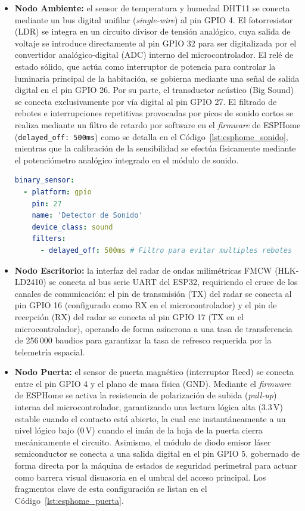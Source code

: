 \begin{itemize}
    \item \textbf{Nodo Ambiente:} el sensor de temperatura y humedad DHT11 se conecta mediante un bus digital unifilar (\textit{single-wire}) al pin GPIO 4. El fotorresistor (LDR) se integra en un circuito divisor de tensión analógico, cuya salida de voltaje se introduce directamente al pin GPIO 32 para ser digitalizada por el convertidor analógico-digital (ADC) interno del microcontrolador. El relé de estado sólido, que actúa como interruptor de potencia para controlar la luminaria principal de la habitación, se gobierna mediante una señal de salida digital en el pin GPIO 26. Por su parte, el transductor acústico (Big Sound) se conecta exclusivamente por vía digital al pin GPIO 27. El filtrado de rebotes e interrupciones repetitivas provocadas por picos de sonido cortos se realiza mediante un filtro de retardo por software en el \textit{firmware} de ESPHome (\texttt{delayed\_off: 500ms}) como se detalla en el Código~\ref{lst:esphome_sonido}, mientras que la calibración de la sensibilidad se efectúa físicamente mediante el potenciómetro analógico integrado en el módulo de sonido.

\begin{lstlisting}[language=YAML, caption={Declaración del transductor acústico y su filtro en el firmware de ESPHome (Nodo Ambiente).}, label={lst:esphome_sonido}]
binary_sensor:
  - platform: gpio
    pin: 27
    name: 'Detector de Sonido'
    device_class: sound
    filters:
      - delayed_off: 500ms # Filtro para evitar multiples rebotes
\end{lstlisting}

    \item \textbf{Nodo Escritorio:} la interfaz del radar de ondas milimétricas FMCW (HLK-LD2410) se conecta al bus serie UART del ESP32, requiriendo el cruce de los canales de comunicación: el pin de transmisión (TX) del radar se conecta al pin GPIO 16 (configurado como RX en el microcontrolador) y el pin de recepción (RX) del radar se conecta al pin GPIO 17 (TX en el microcontrolador), operando de forma asíncrona a una tasa de transferencia de 256\,000 baudios para garantizar la tasa de refresco requerida por la telemetría espacial.
    \item \textbf{Nodo Puerta:} el sensor de puerta magnético (interruptor Reed) se conecta entre el pin GPIO 4 y el plano de masa física (GND). Mediante el \textit{firmware} de ESPHome se activa la resistencia de polarización de subida (\textit{pull-up}) interna del microcontrolador, garantizando una lectura lógica alta (3.3\,V) estable cuando el contacto está abierto, la cual cae instantáneamente a un nivel lógico bajo (0\,V) cuando el imán de la hoja de la puerta cierra mecánicamente el circuito. Asimismo, el módulo de diodo emisor láser semiconductor se conecta a una salida digital en el pin GPIO 5, gobernado de forma directa por la máquina de estados de seguridad perimetral para actuar como barrera visual disuasoria en el umbral del acceso principal. Los fragmentos clave de esta configuración se listan en el Código~\ref{lst:esphome_puerta}.


\end{itemize}
